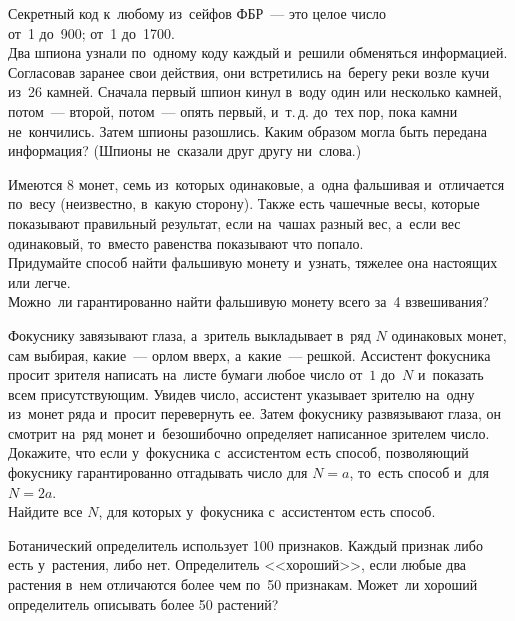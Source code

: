 \begin{problems}
\item
Секретный код к~любому из~сейфов ФБР~--- это целое число
\\
\subproblem от~1 до~900;
\qquad
\subproblemx{*} от~1 до~1700.
\\
Два шпиона узнали по~одному коду каждый и~решили обменяться информацией.
Согласовав заранее свои действия, они встретились на~берегу реки возле кучи
из~26 камней.
Сначала первый шпион кинул в~воду один или несколько камней, потом~--- второй,
потом~--- опять первый, и~т.\,д. до~тех пор, пока камни не~кончились.
Затем шпионы разошлись.
Каким образом могла быть передана информация?
(Шпионы не~сказали друг другу ни~слова.)

\item
Имеются 8 монет, семь из~которых одинаковые, а~одна фальшивая и~отличается
по~весу (неизвестно, в~какую сторону).
Также есть чашечные весы, которые показывают правильный результат, если
на~чашах разный вес, а~если вес одинаковый, то~вместо равенства показывают что
попало.
\\
\subproblem
Придумайте способ найти фальшивую монету и~узнать, тяжелее она настоящих или
легче.
\\
\subproblem
Можно~ли гарантированно найти фальшивую монету всего за~4 взвешивания?

\item
Фокуснику завязывают глаза, а~зритель выкладывает в~ряд $N$ одинаковых монет,
сам выбирая, какие~--- орлом вверх, а~какие~--- решкой.
Ассистент фокусника просит зрителя написать на~листе бумаги любое число от~$1$
до~$N$ и~показать всем присутствующим.
Увидев число, ассистент
указывает зрителю на~одну из~монет ряда и~просит
перевернуть ее.
Затем фокуснику развязывают глаза, он смотрит на~ряд монет и~безошибочно
определяет написанное зрителем число.
\\
\subproblem
Докажите, что если у~фокусника с~ассистентом есть способ, позволяющий фокуснику
гарантированно отгадывать число для $N = a$, то~есть способ и~для $N = 2 a$.
\\
\subproblem
Найдите все $N$, для которых у~фокусника с~ассистентом есть способ.

\item
Ботанический определитель использует 100 признаков.
Каждый признак либо есть у~растения, либо нет.
Определитель <<хороший>>, если любые два растения в~нем отличаются более чем
по~50 признакам.
Может~ли хороший определитель описывать более 50 растений?

\end{problems}

